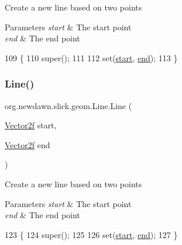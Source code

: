 Create a new line based on two points


\begin{DoxyParams}{Parameters}
{\em start} & The start point \\
\hline
{\em end} & The end point \\
\hline
\end{DoxyParams}

\begin{DoxyCode}
109                                             \{
110         super();
111 
112         \textcolor{keyword}{set}(\mbox{\hyperlink{classorg_1_1newdawn_1_1slick_1_1geom_1_1_line_aaf3a6c6053990b96a501b80081258f92}{start}}, \mbox{\hyperlink{classorg_1_1newdawn_1_1slick_1_1geom_1_1_line_abc89f3da558e2d29ad48f3c453c25f92}{end}});
113     \}
\end{DoxyCode}
\mbox{\label{classorg_1_1newdawn_1_1slick_1_1geom_1_1_line_aafd1a4158a58133ab57345a53507495e}} 
\subsubsection{\texorpdfstring{Line()}{Line()}\hspace{0.1cm}{\footnotesize\ttfamily [6/6]}}
{\footnotesize\ttfamily org.\+newdawn.\+slick.\+geom.\+Line.\+Line (\begin{DoxyParamCaption}\item[{\mbox{\hyperlink{classorg_1_1newdawn_1_1slick_1_1geom_1_1_vector2f}{Vector2f}}}]{start,  }\item[{\mbox{\hyperlink{classorg_1_1newdawn_1_1slick_1_1geom_1_1_vector2f}{Vector2f}}}]{end }\end{DoxyParamCaption})\hspace{0.3cm}{\ttfamily [inline]}}

Create a new line based on two points


\begin{DoxyParams}{Parameters}
{\em start} & The start point \\
\hline
{\em end} & The end point \\
\hline
\end{DoxyParams}

\begin{DoxyCode}
123                                               \{
124         super();
125 
126         \textcolor{keyword}{set}(\mbox{\hyperlink{classorg_1_1newdawn_1_1slick_1_1geom_1_1_line_aaf3a6c6053990b96a501b80081258f92}{start}}, \mbox{\hyperlink{classorg_1_1newdawn_1_1slick_1_1geom_1_1_line_abc89f3da558e2d29ad48f3c453c25f92}{end}});
127     \}
\end{DoxyCode}


